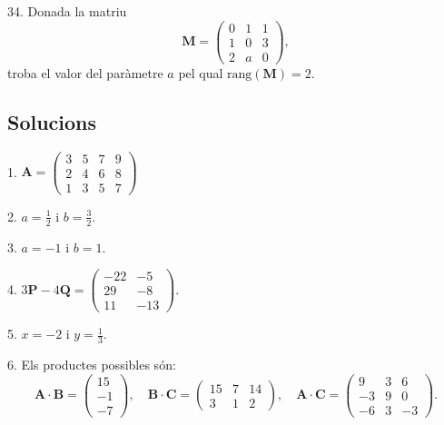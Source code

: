 \documentclass[12pt]{article}
\newcommand{\mat}[1]{\mathbf{#1}}
\begin{document}
\begin{exercici}
34. Donada la matriu
\[
\mat{M} = 
\begin{pmatrix}
0 & 1 & 1 \\
1 & 0 & 3 \\
2 & a & 0
\end{pmatrix},
\]
troba el valor del paràmetre $a$ pel qual $\text{rang}(\mat{M}) = 2$.
\end{exercici}

\newpage
\subsection{Solucions}

\begin{exercici}
1. $\mat{A} = 
\begin{pmatrix}
3 & 5 & 7 & 9 \\
2 & 4 & 6 & 8 \\
1 & 3 & 5 & 7
\end{pmatrix}$
\end{exercici}

\begin{exercici}
2. $a = \frac{1}{2}$ i $b = \frac{3}{2}$.
\end{exercici}

\begin{exercici}
3. $a = -1$ i $b = 1$.
\end{exercici}

\begin{exercici}
4. $3\mat{P} - 4\mat{Q} = 
\begin{pmatrix}
-22 & -5 \\
29 & -8 \\
11 & -13
\end{pmatrix}$.
\end{exercici}

\begin{exercici}
5. $x = -2$ i $y = \frac{1}{3}$.
\end{exercici}

\begin{exercici}
6. Els productes possibles són:
\[
\mat{A} \cdot \mat{B} = 
\begin{pmatrix}
15 \\
-1 \\
-7
\end{pmatrix}, \quad 
\mat{B} \cdot \mat{C} = 
\begin{pmatrix}
15 & 7 & 14 \\
3 & 1 & 2
\end{pmatrix}, \quad 
\mat{A} \cdot \mat{C} = 
\begin{pmatrix}
9 & 3 & 6 \\
-3 & 9 & 0 \\
-6 & 3 & -3
\end{pmatrix}.
\]
\end{exercici}
\end{document}
